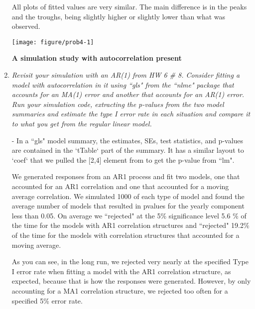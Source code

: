 \documentclass[11pt]{article}\usepackage[]{graphicx}\usepackage[]{color}
\makeatletter
\def\maxwidth{ %
  \ifdim\Gin@nat@width>\linewidth
    \linewidth
  \else
    \Gin@nat@width
  \fi
}
\newenvironment{knitrout}{}{} %
\makeatother
\begin{document}
\begin{enumerate}
All plots of fitted values are very similar. The main difference is in the peaks and the troughs, being slightly higher or slightly lower than what was observed. 

\begin{knitrout}\footnotesize
{}\color{fgcolor}

{\centering \texttt{[image: figure/prob4-1]} 

}



\end{knitrout}

\begin{center}
{\large \bf{A simulation study with autocorrelation present}}
\end{center}

\item%
{\it Revisit your simulation with an AR(1) from HW 6 # 8. Consider fitting a model with autocorrelation in it using ``gls" from the ``nlme" package that accounts for an MA(1) error and another that accounts for an AR(1) error. Run your simulation code, extracting the p-values from the two model summaries and estimate the type I error rate in each situation and compare it to what you get from the regular linear model. 



- In a ``gls" model summary, the estimates, SEs, test statistics, and p-values are contained in the `tTable` part of the summary. It has a similar layout to `coef` that we pulled the [2,4] element from to get the p-value from ``lm".}

We generated responses from an AR1 process and fit two models, one that accounted for an AR1 correlation and one that accounted for a moving average correlation. We simulated 1000 of each type of model and found the average number of models that resulted in pvalues for the yearly component less than 0.05. On average we ``rejected" at the 5\% significance level 5.6 \% of the time for the models with AR1 correlation structures and ``rejected" 19.2\% of the time for the models with correlation structures that accounted for a moving average. 

As you can see, in the long run, we rejected very nearly at the specified Type I error rate when fitting a model with the AR1 correlation structure, as expected, because that is how the responses were generated. However, by only accounting for a MA1 correlation structure, we rejected too often for a specified 5\% error rate.


\end{enumerate}
\end{document}
